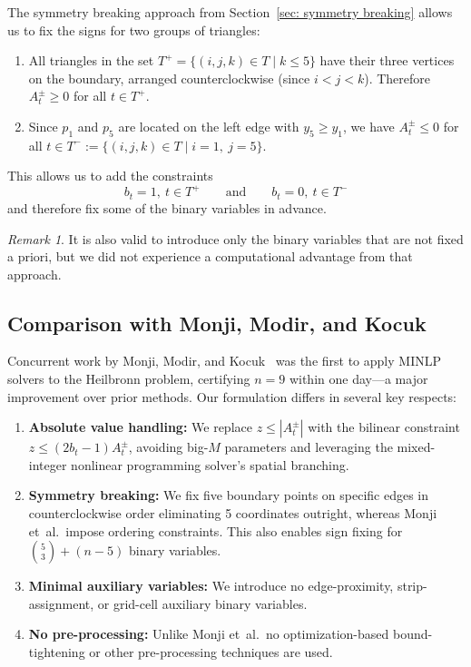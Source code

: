 \documentclass[11pt,a4paper]{article}
\theoremstyle{plain}
\theoremstyle{definition}
\theoremstyle{remark}
\newtheorem{remark}{Remark}
\begin{document}
The symmetry breaking approach from Section~\ref{sec: symmetry breaking} allows us to fix the signs for two groups of triangles:
\begin{enumerate}
  \item All triangles in the set $T^+=\{(i,j,k)\in T\mid k\le 5\}$ have their three vertices on the boundary, arranged counterclockwise (since $i<j<k$). Therefore $A_t^\pm\ge 0$ for all $t\in T^+$.
  \item Since $p_1$ and $p_5$ are located on the left edge with $y_5\ge y_1$, we have $A_t^\pm\le 0$ for all $t\in T^-:=\{(i,j,k)\in T\mid i=1,\ j=5\}$.
\end{enumerate}

This allows us to add the constraints
\[
b_t=1,\ t\in T^+\qquad\text{and}\qquad b_t=0,\ t\in T^-
\]
and therefore fix some of the binary variables in advance.
\begin{remark}
  It is also valid to introduce only the binary variables that are not fixed a priori, but we did not experience a computational advantage from that approach.
\end{remark}

  \subsection{Comparison with Monji, Modir, and Kocuk}\label{sec:comparison-monji}

  Concurrent work by Monji, Modir, and Kocuk~\cite{monji2025solvingheilbronntriangleproblem} was the first to apply MINLP solvers to the Heilbronn problem, certifying $n=9$ within one day---a major improvement over prior methods. Our formulation differs in several key respects:
  
\begin{enumerate}
  \item \textbf{Absolute value handling:} We replace $z \le |A_t^\pm|$ with the bilinear constraint $z \le (2b_t-1)A_t^\pm$, avoiding big-$M$ parameters and leveraging the mixed-integer nonlinear programming solver's spatial branching.

  \item \textbf{Symmetry breaking:} We fix five boundary points on specific edges in counterclockwise order eliminating 5 coordinates outright, whereas Monji et~al.\ impose ordering constraints. This also enables sign fixing for $\binom{5}{3} + (n-5)$ binary variables.

  \item \textbf{Minimal auxiliary variables:} We introduce no edge-proximity, strip-assignment, or grid-cell auxiliary binary variables.

  \item \textbf{No pre-processing:} Unlike Monji et~al.\ no optimization-based bound-tightening or other pre-processing techniques are used.
\end{enumerate}
\end{document}
